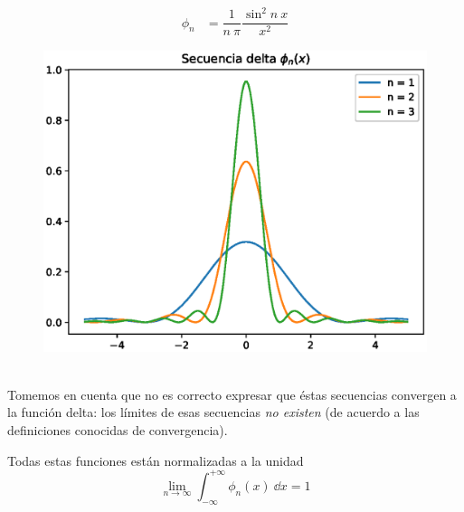 \\
\begin{minipage}{4cm}
\begin{align*}
\phi_{n} &= \dfrac{1}{n \: \pi} \dfrac{\sin^{2} n \: x}{x^{2}}
\end{align*}
\end{minipage}
\hspace{1cm}
\begin{minipage}{9cm}
\begin{figure}[H]
\includegraphics[scale=0.6]{Imagenes/secuencia_delta_03.eps}
\end{figure}
\end{minipage}
\\
Tomemos en cuenta que no es correcto expresar que éstas secuencias convergen a la función delta: los límites de esas secuencias \emph{no existen} (de acuerdo a las definiciones conocidas de convergencia).

Todas estas funciones están normalizadas a la unidad
\begin{equation}
\lim_{n \to \infty} \int_{- \infty}^{+ \infty} \phi_{n}(x) \: \dd{x} = 1
\label{eq:ecuacion_delta_05}
\end{equation}
